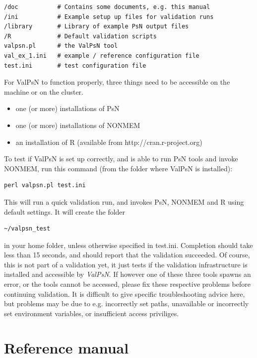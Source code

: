 \documentclass[a4,11pt]{report} \usepackage[pdftex]{graphicx}
\newcommand{\ValPsN}{\textcolor{PiranaOrange}{\textit{ValPsN}}\xspace}
\begin{document}
\begin{lstlisting}
/doc           # Contains some documents, e.g. this manual
/ini           # Example setup up files for validation runs
/library       # Library of example PsN output files
/R             # Default validation scripts
valpsn.pl      # the ValPsN tool
val_ex_1.ini   # example / reference configuration file
test.ini       # test configuration file
\end{lstlisting}

\noindent For ValPsN to function properly, three things need to be accessible on
the machine or on the cluster.
\begin{itemize}
\item one (or more) installations of PsN
\item one (or more) installations of NONMEM
\item an installation of R (available from http://cran.r-project.org)
\end{itemize}

\noindent To test if ValPsN is set up correctly, and is able to run PsN tools
and invoke NONMEM, run this command (from the folder where ValPsN is
installed):

\vspace{5pt}
\begin{lstlisting}
perl valpsn.pl test.ini
\end{lstlisting}
\vspace{5pt}

\noindent This will run a quick validation run, and invokes PsN,
NONMEM and R using default settings. It will create the folder

\begin{verbatim}
~/valpsn_test
\end{verbatim}

in your home folder, unless otherwise specified in
test.ini. Completion should take less than 15 seconds, and should
report that the validation succeeded. Of course, this is not part of a
validation yet, it just tests if the validation infrastructure is
installed and accessible by \ValPsN. If however one of these three
tools spawns an error, or the tools cannot be accessed, please fix
these respective problems before continuing validation. It is
difficult to give specific troubleshooting advice here, but problems
may be due to e.g. incorrectly set paths, unavailable or incorrectly
set environment variables, or insufficient access priviliges.

\chapter{Reference manual}
\end{document}
